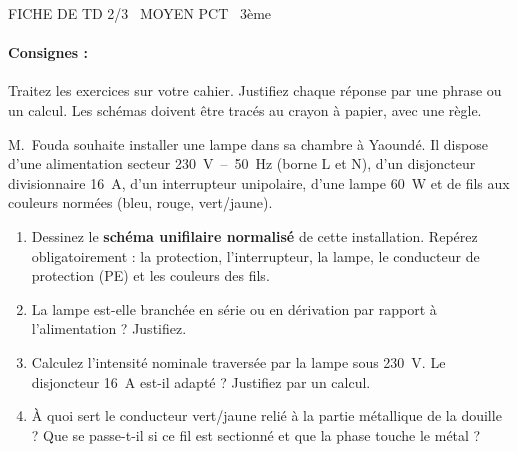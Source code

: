 \documentclass[11pt]{article}
\begin{document}
\begin{tcolorbox}[enhanced,colback=popink,colframe=popink,arc=10pt,boxrule=0pt,left=12pt,right=12pt,top=9pt,bottom=9pt]
{\color{white}\popxbold\small FICHE DE TD 2/3 \textbullet\ MOYEN \hfill PCT \textbullet\ 3ème\par}
\end{tcolorbox}
\vspace{4pt}
\paragraph{Consignes :} Traitez les exercices sur votre cahier. Justifiez chaque réponse par une phrase ou un calcul. Les schémas doivent être tracés au crayon à papier, avec une règle.

\begin{exercice}
M.~Fouda souhaite installer une lampe dans sa chambre à Yaoundé. Il dispose d'une alimentation secteur \SI{230}{\volt}~--~\SI{50}{\hertz} (borne L et N), d'un disjoncteur divisionnaire \SI{16}{\ampere}, d'un interrupteur unipolaire, d'une lampe \SI{60}{\watt} et de fils aux couleurs normées (bleu, rouge, vert/jaune).
\begin{enumerate}
    \item Dessinez le \textbf{schéma unifilaire normalisé} de cette installation. Repérez obligatoirement : la protection, l'interrupteur, la lampe, le conducteur de protection (PE) et les couleurs des fils.
    \item La lampe est-elle branchée en série ou en dérivation par rapport à l'alimentation ? Justifiez.
    \item Calculez l'intensité nominale traversée par la lampe sous \SI{230}{\volt}. Le disjoncteur \SI{16}{\ampere} est-il adapté ? Justifiez par un calcul.
    \item À quoi sert le conducteur vert/jaune relié à la partie métallique de la douille ? Que se passe-t-il si ce fil est sectionné et que la phase touche le métal ?
\end{enumerate}
\end{exercice}
\end{document}
